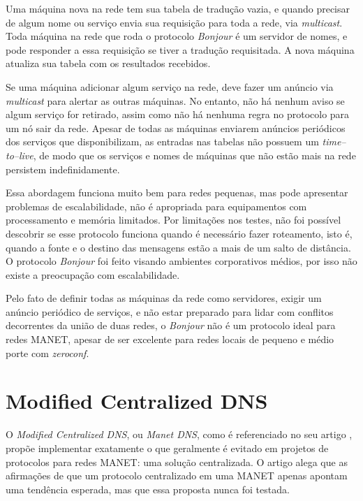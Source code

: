        Uma máquina nova na rede tem sua tabela de tradução vazia, e quando 
        precisar de algum nome ou serviço envia sua requisição para toda a rede,
        via \textit{multicast}. Toda máquina na rede que roda o protocolo
        \textit{Bonjour} é um servidor de nomes, e pode responder a essa 
        requisição se tiver a tradução requisitada. A nova máquina atualiza sua 
        tabela com os resultados recebidos.

        Se uma máquina adicionar algum serviço na rede, deve fazer um anúncio via
        \textit{multicast} para alertar as outras máquinas. No entanto, não há 
        nenhum aviso se algum serviço for retirado, assim como não há nenhuma 
        regra no protocolo para um nó sair da rede. Apesar de todas as máquinas 
        enviarem anúncios periódicos dos serviços que disponibilizam, as entradas
        nas tabelas não possuem um \textit{time--to--live}, de modo que os serviços
        e nomes de máquinas que não estão mais na rede persistem indefinidamente.

        Essa abordagem funciona muito bem para redes pequenas, mas pode apresentar
        problemas de escalabilidade, não é apropriada para equipamentos com 
        processamento e memória limitados. Por limitações nos testes, não foi possível
        descobrir se esse protocolo funciona quando é necessário fazer roteamento,
        isto é, quando a fonte e o destino das mensagens estão a mais de um salto
        de distância. O protocolo \textit{Bonjour} foi feito visando ambientes 
        corporativos médios, por isso não existe a preocupação com escalabilidade.
        
        Pelo fato de definir todas as máquinas da rede como servidores, exigir um
        anúncio periódico de serviços, e não estar preparado para lidar com conflitos
        decorrentes da união de duas redes, o \textit{Bonjour} não é um protocolo
        ideal para redes MANET, apesar de ser excelente para redes locais de pequeno
        e médio porte com \textit{zeroconf}.


\section{Modified Centralized DNS}
\label{MCDNS}

    O \textit{Modified Centralized DNS}, ou \textit{Manet DNS}, como é referenciado
    no seu artigo \cite{mcdns}, propõe implementar exatamente o que geralmente é
    evitado em projetos de protocolos para redes MANET: uma solução centralizada.
    O artigo alega que as afirmações de que um protocolo centralizado em uma MANET
    apenas apontam uma tendência esperada, mas que essa proposta nunca foi testada.
  
